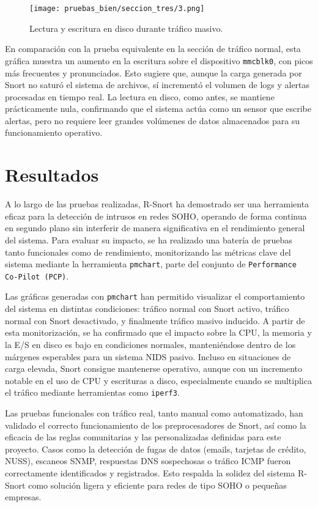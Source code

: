 \documentclass[11pt,a4paper,twoside]{report}
\begin{document}
\begin{figure}[H]
	\centering
	\texttt{[image: pruebas\_bien/seccion\_tres/3.png]}
	\caption{Lectura y escritura en disco durante tráfico masivo.}
\end{figure}

En comparación con la prueba equivalente en la sección de tráfico normal, esta gráfica muestra un aumento en la escritura sobre el dispositivo \texttt{mmcblk0}, con picos más frecuentes y pronunciados. Esto sugiere que, aunque la carga generada por Snort no saturó el sistema de archivos, sí incrementó el volumen de logs y alertas procesadas en tiempo real. La lectura en disco, como antes, se mantiene prácticamente nula, confirmando que el sistema actúa como un sensor que escribe alertas, pero no requiere leer grandes volúmenes de datos almacenados para su funcionamiento operativo.

\pagebreak

\chapter{Resultados}

A lo largo de las pruebas realizadas, R-Snort ha demostrado ser una herramienta eficaz para la detección de intrusos en redes SOHO, operando de forma continua en segundo plano sin interferir de manera significativa en el rendimiento general del sistema. Para evaluar su impacto, se ha realizado una batería de pruebas tanto funcionales como de rendimiento, monitorizando las métricas clave del sistema mediante la herramienta \texttt{pmchart}, parte del conjunto de \texttt{Performance Co-Pilot (PCP)}.\newline

Las gráficas generadas con \texttt{pmchart} han permitido visualizar el comportamiento del sistema en distintas condiciones: tráfico normal con Snort activo, tráfico normal con Snort desactivado, y finalmente tráfico masivo inducido. A partir de esta monitorización, se ha confirmado que el impacto sobre la CPU, la memoria y la E/S en disco es bajo en condiciones normales, manteniéndose dentro de los márgenes esperables para un sistema NIDS pasivo. Incluso en situaciones de carga elevada, Snort consigue mantenerse operativo, aunque con un incremento notable en el uso de CPU y escrituras a disco, especialmente cuando se multiplica el tráfico mediante herramientas como \texttt{iperf3}.\newline

Las pruebas funcionales con tráfico real, tanto manual como automatizado, han validado el correcto funcionamiento de los preprocesadores de Snort, así como la eficacia de las reglas comunitarias y las personalizadas definidas para este proyecto. Casos como la detección de fugas de datos (emails, tarjetas de crédito, NUSS), escaneos SNMP, respuestas DNS sospechosas o tráfico ICMP fueron correctamente identificados y registrados. Esto respalda la solidez del sistema R-Snort como solución ligera y eficiente para redes de tipo SOHO o pequeñas empresas.
\end{document}
